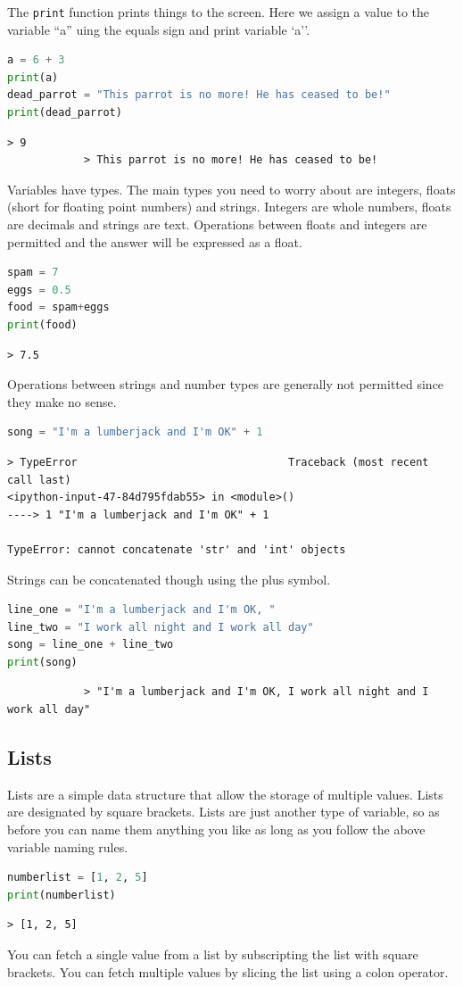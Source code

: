 The \texttt{print} function prints things to the screen. Here we assign a value to the variable ``a'' uing the equals sign and print variable `a''.
		\begin{lstlisting}[language=Python]
a = 6 + 3
print(a)
dead_parrot = "This parrot is no more! He has ceased to be!"
print(dead_parrot)\end{lstlisting}
		\begin{verbatim}> 9
			> This parrot is no more! He has ceased to be!
		\end{verbatim}
		Variables have types. The main types you need to worry about are integers, floats (short for floating point numbers) and strings. Integers are whole numbers, floats are decimals and strings are text. Operations between floats and integers are permitted and the answer will be expressed as a float.
		\begin{lstlisting}[language=Python]
spam = 7
eggs = 0.5
food = spam+eggs
print(food)
\end{lstlisting}
		\begin{verbatim}> 7.5\end{verbatim}	
		Operations between strings and number types are generally not permitted since they make no sense.
		\begin{lstlisting}[language=Python]
song = "I'm a lumberjack and I'm OK" + 1\end{lstlisting}
		\begin{verbatim}> TypeError                                 Traceback (most recent call last)
<ipython-input-47-84d795fdab55> in <module>()
----> 1 "I'm a lumberjack and I'm OK" + 1

TypeError: cannot concatenate 'str' and 'int' objects\end{verbatim}

Strings can be concatenated though using the plus symbol.	
		\begin{lstlisting}[language=Python]
line_one = "I'm a lumberjack and I'm OK, "
line_two = "I work all night and I work all day"
song = line_one + line_two
print(song)\end{lstlisting}
		\begin{verbatim}
			> "I'm a lumberjack and I'm OK, I work all night and I work all day"
		\end{verbatim}

	\subsection{Lists}
	Lists are a simple data structure that allow the storage of multiple values. Lists are designated by square brackets. Lists are just another type of variable, so as before you can name them anything you like as long as you follow the above variable naming rules.
		\begin{lstlisting}[language=Python]
numberlist = [1, 2, 5]
print(numberlist)\end{lstlisting}
		\begin{verbatim}> [1, 2, 5]\end{verbatim}
		You can fetch a single value from a list by subscripting the list with square brackets. You can fetch multiple values by slicing the list using a colon operator.
		
